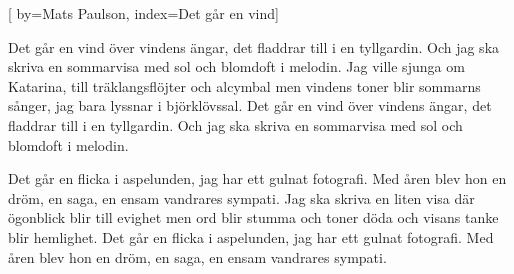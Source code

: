 


[ 	%
	by={Mats Paulson},
	index={Det går en vind}]		%
	
\beginverse*		%
Det går en vind över vindens ängar,
det fladdrar till i en tyllgardin.
Och jag ska skriva en sommarvisa
med sol och blomdoft i melodin.
Jag ville sjunga om Katarina,
till träklangsflöjter och alcymbal
men vindens toner blir sommarns sånger,
jag bara lyssnar i björklövssal.
Det går en vind över vindens ängar,
det fladdrar till i en tyllgardin.
Och jag ska skriva en sommarvisa
med sol och blomdoft i melodin.
\endverse			%

\beginverse*		%
Det går en flicka i aspelunden,
jag har ett gulnat fotografi.
Med åren blev hon en dröm, en saga,
en ensam vandrares sympati.
Jag ska skriva en liten visa
där ögonblick blir till evighet
men ord blir stumma och toner döda
och visans tanke blir hemlighet.
Det går en flicka i aspelunden,
jag har ett gulnat fotografi.
Med åren blev hon en dröm, en saga,
en ensam vandrares sympati.
\endverse			%
\endsong			%
